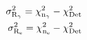 \begin{equation}
\begin{split}
\rm \sigma_{R_\gamma}^2 = \chi_{n_\gamma}^2 - \chi_{Det}^2  \\
\rm \sigma_{R_e}^2 = \chi_{n_e}^2 - \chi_{Det}^2 \\
\label{eq:SigR_Cent}
\end{split}
\end{equation}

